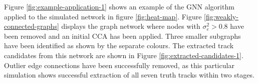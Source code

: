 Figure \ref{fig:example-application-1} shows an example of the GNN algorithm applied to the simulated network in figure \ref{fig:heat-map}. Figure \ref{fig:weakly-connected-graphs} displays the graph network where nodes with $\sigma_e^2 > 0.8$ have been removed and an initial CCA has been applied. Three smaller subgraphs have been identified as shown by the separate colours. The extracted track candidates from this network are shown in Figure \ref{fig:extracted-candidates-1}. Outlier edge connections have been successfully removed, as this particular simulation shows successful extraction of all seven truth tracks within two stages.



\begin{center}
\begin{figure}[htbp]%
    \centering
    \hfill

\end{figure}
\end{center}
